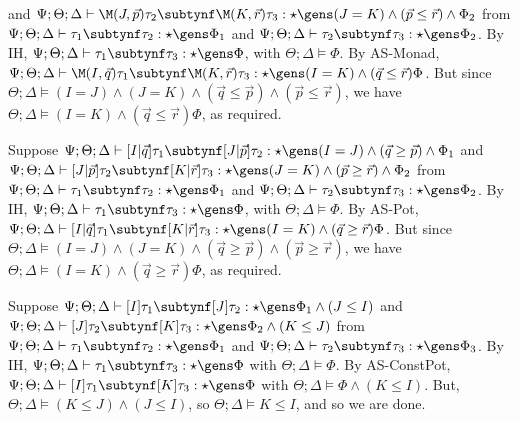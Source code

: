   and $\Psi ; \Theta ; \Delta \vdash \M(J,\vec{p}) \tau_2 \subtynf \M(K,\vec{r}) \tau_3 : \star \gens (J = K) \wedge (\vec{p} \leq \vec{r}) \wedge \Phi_2$
  from $\Psi ; \Theta ; \Delta \vdash \tau_1 \subtynf \tau_2 : \star \gens \Phi_1$ and
  $\Psi ; \Theta ; \Delta \vdash \tau_2 \subtynf \tau_3 : \star \gens \Phi_2$.
  By IH, $\Psi ; \Theta ; \Delta \vdash \tau_1 \subtynf \tau_3 : \star \gens \Phi$, with $\Theta ; \Delta \vDash \Phi$.
  By AS-Monad, $\Psi ; \Theta ; \Delta \vdash \M(I,\vec{q}) \tau_1 \subtynf \M(K,\vec{r})\tau_3 : \star \gens (I = K) \wedge (\vec{q} \leq \vec{r}) \Phi$.
  But since $\Theta ; \Delta \vDash (I = J) \wedge (J = K) \wedge (\vec{q} \leq \vec{p}) \wedge (\vec{p} \leq \vec{r})$, we have $\Theta ; \Delta \vDash (I = K) \wedge (\vec{q} \leq \vec{r}) \Phi$, as required.
  \item[(AS-Pot)] Suppose $\Psi ; \Theta ; \Delta \vdash [I|\vec{q}] \tau_1 \subtynf [J|\vec{p}] \tau_2 : \star \gens (I = J) \wedge (\vec{q} \geq \vec{p}) \wedge \Phi_1$
  and $\Psi ; \Theta ; \Delta \vdash [J|\vec{p}] \tau_2 \subtynf [K|\vec{r}] \tau_3 : \star \gens (J = K) \wedge (\vec{p} \geq \vec{r}) \wedge \Phi_2$
  from $\Psi ; \Theta ; \Delta \vdash \tau_1 \subtynf \tau_2 : \star \gens \Phi_1$ and
  $\Psi ; \Theta ; \Delta \vdash \tau_2 \subtynf \tau_3 : \star \gens \Phi_2$.
  By IH, $\Psi ; \Theta ; \Delta \vdash \tau_1 \subtynf \tau_3 : \star \gens \Phi$, with $\Theta ; \Delta \vDash \Phi$.
  By AS-Pot, $\Psi ; \Theta ; \Delta \vdash [I|\vec{q}] \tau_1 \subtynf [K|\vec{r}] \tau_3 : \star \gens (I = K) \wedge (\vec{q} \geq \vec{r}) \Phi$.
  But since $\Theta ; \Delta \vDash (I = J) \wedge (J = K) \wedge (\vec{q} \geq \vec{p}) \wedge (\vec{p} \geq \vec{r})$, we have $\Theta ; \Delta \vDash (I = K) \wedge (\vec{q} \geq \vec{r}) \Phi$, as required.
  \item[(AS-ConstPot)] Suppose $\Psi ; \Theta ; \Delta \vdash [I] \tau_1 \subtynf [J] \tau_2 : \star \gens \Phi_1 \wedge (J \leq I)$
  and $\Psi ; \Theta ; \Delta \vdash [J] \tau_2 \subtynf [K] \tau_3 : \star \gens \Phi_2 \wedge (K \leq J)$
  from $\Psi ; \Theta ; \Delta \vdash \tau_1 \subtynf \tau_2 : \star \gens \Phi_1$ and $\Psi ; \Theta ; \Delta \vdash \tau_2 \subtynf \tau_3 : \star \gens \Phi_3$.
  By IH, $\Psi ; \Theta ; \Delta \vdash \tau_1 \subtynf \tau_3 : \star \gens \Phi$ with $\Theta ; \Delta \vDash \Phi$.
  By AS-ConstPot, $\Psi ; \Theta ; \Delta \vdash [I] \tau_1 \subtynf [K]\tau_3 : \star \gens \Phi$ with $\Theta ; \Delta \vDash \Phi \wedge (K \leq I)$. But, $\Theta ; \Delta \vDash (K \leq J) \wedge (J \leq I)$, so $\Theta ; \Delta \vDash K \leq I$, and so we are done. 
